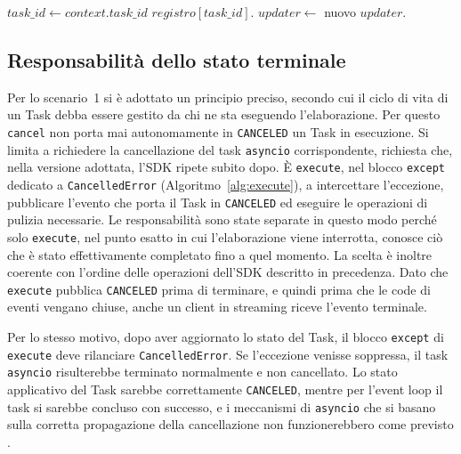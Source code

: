 \begin{algorithm}[htbp]
\caption{Logica di \texttt{cancel}}
\label{alg:cancel}
\begin{algorithmic}[1]
 
    \State $task\_id \gets context.task\_id$
     
        \State $registro[task\_id].$
        \State \Return
    \EndIf
    \State $updater \gets$ nuovo 
    \State $updater.$ 
\EndFunction
\end{algorithmic}
\end{algorithm}


\subsection{Responsabilità dello stato terminale}

Per lo scenario~1 si è adottato un principio preciso, secondo cui il ciclo di vita di un Task debba essere gestito da chi ne sta eseguendo l'elaborazione. Per questo \texttt{cancel} non porta mai autonomamente in \texttt{CANCELED} un Task in esecuzione. Si limita a richiedere la cancellazione del task \texttt{asyncio} corrispondente, richiesta che, nella versione adottata, l'SDK ripete subito dopo. È \texttt{execute}, nel blocco \texttt{except} dedicato a \texttt{CancelledError} (Algoritmo~\ref{alg:execute}), a intercettare l'eccezione, pubblicare l'evento che porta il Task in \texttt{CANCELED} ed eseguire le operazioni di pulizia necessarie. Le responsabilità sono state separate in questo modo perché solo \texttt{execute}, nel punto esatto in cui l'elaborazione viene interrotta, conosce ciò che è stato effettivamente completato fino a quel momento. La scelta è inoltre coerente con l'ordine delle operazioni dell'SDK descritto in precedenza. Dato che \texttt{execute} pubblica \texttt{CANCELED} prima di terminare, e quindi prima che le code di eventi vengano chiuse, anche un client in streaming riceve l'evento terminale.

Per lo stesso motivo, dopo aver aggiornato lo stato del Task, il blocco \texttt{except} di \texttt{execute} deve rilanciare \texttt{CancelledError}. Se l'eccezione venisse soppressa, il task \texttt{asyncio} risulterebbe terminato normalmente e non cancellato. Lo stato applicativo del Task sarebbe correttamente \texttt{CANCELED}, mentre per l'event loop il task si sarebbe concluso con successo, e i meccanismi di \texttt{asyncio} che si basano sulla corretta propagazione della cancellazione non funzionerebbero come previsto \cite{pythonasynciotask}.

